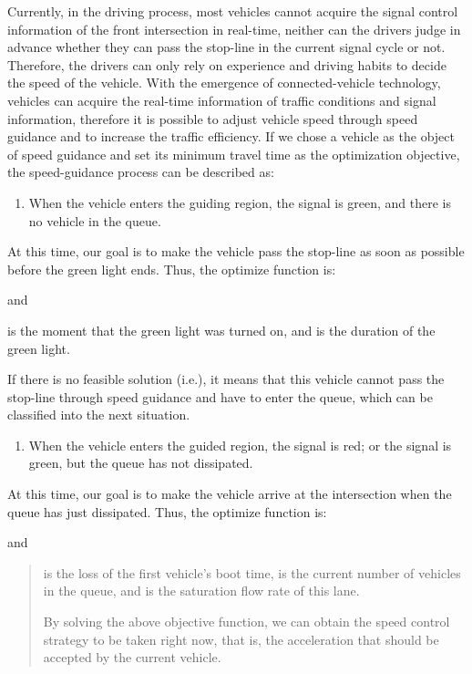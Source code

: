 Currently, in the driving process, most vehicles cannot acquire the
signal control information of the front intersection in real-time,
neither can the drivers judge in advance whether they can pass the
stop-line in the current signal cycle or not. Therefore, the drivers can
only rely on experience and driving habits to decide the speed of the
vehicle. With the emergence of connected-vehicle technology, vehicles
can acquire the real-time information of traffic conditions and signal
information, therefore it is possible to adjust vehicle speed through
speed guidance and to increase the traffic efficiency. If we chose a
vehicle as the object of speed guidance and set its minimum travel time
as the optimization objective, the speed-guidance process can be
described as:

\begin{enumerate}
\def\labelenumi{\alph{enumi})}
\item
  When the vehicle enters the guiding region, the signal is green, and
  there is no vehicle in the queue.
\end{enumerate}

At this time, our goal is to make the vehicle pass the stop-line as soon
as possible before the green light ends. Thus, the optimize function is:

and

is the moment that the green light was turned on, and is the duration of
the green light.

If there is no feasible solution (i.e.), it means that this vehicle
cannot pass the stop-line through speed guidance and have to enter the
queue, which can be classified into the next situation.

\begin{enumerate}
\def\labelenumi{\alph{enumi})}
\item
  When the vehicle enters the guided region, the signal is red; or the
  signal is green, but the queue has not dissipated.
\end{enumerate}

At this time, our goal is to make the vehicle arrive at the intersection
when the queue has just dissipated. Thus, the optimize function is:

and

\begin{quote}
is the loss of the first vehicle's boot time, is the current number of
vehicles in the queue, and is the saturation flow rate of this lane.

By solving the above objective function, we can obtain the speed control
strategy to be taken right now, that is, the acceleration that should be
accepted by the current vehicle.
\end{quote}


